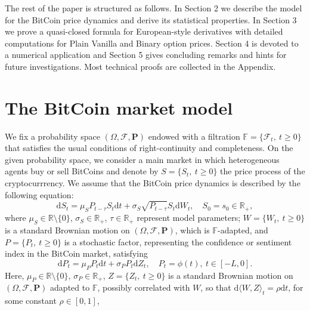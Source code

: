 \documentclass[12pt,centertags,reqno]{amsart}
\numberwithin{equation}{section} \makeatletter
\def \F {\mathcal F}
\def \P {\mathbf P}
\def \R {\mathbb R}
\def \bF {\mathbb F}
\newcommand{\ud}{\mathrm d}
\begin{document}
The rest of the paper is structured as follows. In Section 2 we describe the model for the BitCoin price dynamics and derive its statistical properties. In Section 3 we prove a quasi-closed formula for European-style derivatives with detailed computations for Plain Vanilla and Binary option prices. Section 4 is devoted to a numerical application and Section 5 gives concluding remarks and hints for future investigations. Most technical proofs are collected in the Appendix.


 

 
\section{The BitCoin market model}

We fix a probability space $(\Omega,\F,\P)$ endowed with a filtration 
$\bF = \{\F_t,\ t \ge 0\}$ that satisfies the usual conditions of right-continuity and completeness. %
On the given probability space, we consider a main market in which heterogeneous agents buy or sell BitCoins and denote by %
$S = \{S_t,\ t \geq 0\}$ the price process
of the cryptocurrrency. We assume that the BitCoin price dynamics is described by 
the following equation:
\begin{equation} \label{eq:S}
\ud S_t = \mu_S P_{t-\tau} S_t \ud t+\sigma_S \sqrt{P_{t-\tau}}S_t\ud W_t,\quad  S_0=s_0 \in \R_+,
\end{equation}
where $\mu_{S} \in \R \setminus \{0\}$, $\sigma_{S}\in \R_+$, $\tau \in \R_+$ represent model parameters;  
$W = \{W_t,\ t \ge 0\}$ is a standard Brownian motion on $(\Omega,\F,\P)$, which is $\bF$-adapted, and
$P = \{P_t,\ t \geq 0\}$ is a stochastic factor, representing the confidence or sentiment index in the BitCoin market, satisfying
\begin{equation}\label{eq:BSdyn}
\ud P_t =\mu_P P_t\ud t+\sigma_P P_t\ud Z_t, %
\quad P_t = \phi(t),\ t \in [-L,0].
\end{equation}
Here, $\mu_P \in \R \setminus \{0\}$, $\sigma_P \in \R_+$, $Z = \{Z_t,\ t \geq 0\}$ is a standard Brownian motion on $(\Omega,\F,\P)$ adapted to $\bF$, possibly correlated with $W$, so that $\ud \langle W,Z\rangle_t = \rho \ud t$, for some constant $\rho \in [0,1]$, %
\end{document}

